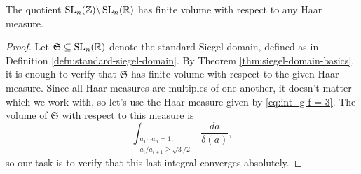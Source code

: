 \documentclass[reqno]{amsart} 
\begin{document}
\begin{theorem}\label{thm:2}
  The quotient $\operatorname{SL}_n(\mathbb{Z}) \backslash \operatorname{SL}_n(\mathbb{R})$ has finite volume with respect to any Haar measure.
\end{theorem}
\begin{proof}
  Let $\mathfrak{S} \subseteq \operatorname{SL}_n(\mathbb{R})$ denote the standard Siegel domain, defined as in Definition \ref{defn:standard-siegel-domain}.  By Theorem \ref{thm:siegel-domain-basics}, it is enough to verify that $\mathfrak{S}$ has finite volume with respect to the given Haar measure.  Since all Haar measures are multiples of one another, it doesn't matter which we work with, so let's use the Haar measure given by \eqref{eq:int_g-f-=-3}.  The volume of $\mathfrak{S}$ with respect to this measure is
  \begin{equation}\label{eq:int-_substack-a_1-6}
    \int _{\substack{
        a_1 \dotsb a_n = 1, \\
        a _i / a _{i + 1} \geq \sqrt{3}/2
      }
    }
    \frac{d a}{\delta (a) },
  \end{equation}
  so our task is to verify that this last integral converges absolutely.


\end{proof}
\end{document}
